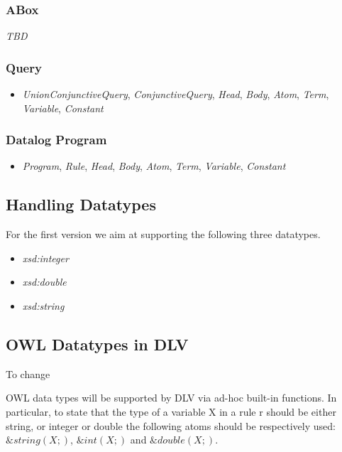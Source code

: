 \documentclass[oneside]{book}
\begin{document}
\subsubsection{ABox}
\textit{TBD}

\subsubsection{Query}
\begin{itemize}
	
	\item  \textit{UnionConjunctiveQuery},  \textit{ConjunctiveQuery},  \textit{Head},  \textit{Body},  \textit{Atom},  \textit{Term},  \textit{Variable},  \textit{Constant}
\end{itemize}


\subsubsection{Datalog Program}
\begin{itemize}
	
	\item  \textit{Program},  \textit{Rule},  \textit{Head},  \textit{Body},  \textit{Atom},  \textit{Term},  \textit{Variable},  \textit{Constant}
\end{itemize}


\subsection{Handling Datatypes}

For the first version we aim at supporting the following three datatypes.

\begin{itemize}
	\item \textit{xsd:integer}
	\item \textit{xsd:double}
	\item \textit{xsd:string}
\end{itemize}




\subsection{OWL Datatypes in DLV}

To change

OWL data types will be supported by DLV via ad-hoc built-in functions. In particular, to state that the type of a variable X in a rule r should be either string, or integer or double the following atoms should be respectively used: $\&string(X;)$, $\&int(X;)$ and $\&double(X;)$. 
\end{document}
